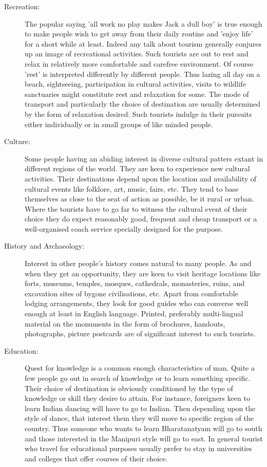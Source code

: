 \begin{description}

\item[Recreation:] The popular saying 'all work no play makes Jack a dull boy' is true enough to make people wish to get away from their daily routine and 'enjoy life' for a short while at least. Indeed any talk about tourism generally conjures up an image of recreational activities. Such tourists are out to rest and relax in relatively more comfortable and carefree environment. Of course 'rest' is interpreted differently by different people. Thus lazing all day on a beach, sightseeing, participation in cultural activities, visits to wildlife sanctuaries might constitute rest and relaxation for some. The mode of transport and particularly the choice of destination are usually determined by the form of relaxation desired. Such tourists indulge in their pursuits either individually or in small groups of like minded people.

\item[Culture:] Some people having an abiding interest in diverse cultural patters extant in different regions of the world. They are keen to experience new cultural activities. Their destinations depend upon the location and availability of cultural events like folklore, art, music, fairs, etc. They tend to base themselves as close to the seat of action as possible, be it rural or urban. Where the tourists have to go far to witness the cultural event of their choice they do expect reasonably good, frequent and cheap transport or a well-organised coach service specially designed for the purpose.

\item[History and Archaeology:] Interest in other people's history comes natural to many people. As and when they get an opportunity, they are keen to visit heritage locations like forts, museums, temples, mosques, cathedrals, monasteries, ruins, and excavation sites of bygone civilisations, etc. Apart from comfortable lodging arrangements, they look for good guides who can converse well enough at least in English language. Printed, preferably multi-lingual material on the monuments in the form of brochures, handouts, photographs, picture postcards are of significant interest to such tourists.

\item[Education:] Quest for knowledge is a common enough characteristics of man. Quite a few people go out in search of knowledge or to learn something specific. Their choice of destination is obviously conditioned by the type of knowledge or skill they desire to attain. For instance, foreigners keen to learn Indian dancing will have to go to Indian. Then depending upon the style of dance, that interest them they will move to specific region of the country. Thus someone who wants to learn Bharatanatyam will go to south and those interested in the Manipuri style will go to east. In general tourist who travel for educational purposes usually prefer to stay in universities and colleges that offer courses of their choice.


\end{description}
